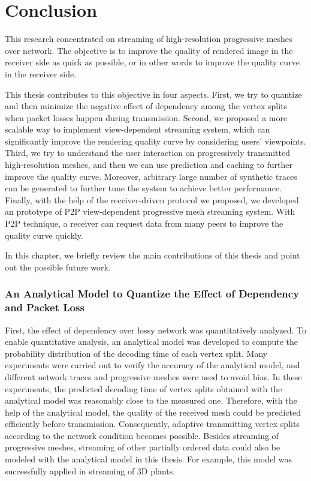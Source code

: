 \chapter{Conclusion}
\label{c:conclusion}
This research concentrated on streaming of high-resolution progressive meshes over network. 
The objective is to improve the quality of rendered image in the receiver side
as quick as possible, or in other words to improve the quality curve in the receiver
side. 

This thesis contributes to this objective in four aspects.
First, we try to quantize and then minimize the negative effect of dependency
among the vertex splits when packet losses happen during transmission.
Second, we proposed a more scalable way to implement view-dependent streaming
system, which can significantly improve the rendering quality curve by considering 
users' viewpoints. 
Third, we try to understand the user interaction on progressively transmitted 
high-resolution meshes, and then we can use prediction and caching to further 
improve the quality curve. Moreover, arbitrary large number of synthetic traces 
can be generated to further tune the system to achieve better performance.
Finally, with the help of the receiver-driven protocol we proposed, we developed 
an prototype of P2P view-dependent progressive mesh streaming system. With P2P
technique, a receiver can request data from many peers to improve the quality curve 
quickly.

In this chapter, we briefly review the main contributions of this thesis and point
out the possible future work.

\subsection{An Analytical Model to Quantize the Effect of Dependency and Packet Loss}
First, the effect of dependency over lossy network was quantitatively analyzed. 
To enable quantitative analysis, an analytical model was developed to compute 
the probability distribution of the decoding time of each vertex split. 
Many experiments were carried out to verify the accuracy of the analytical model, 
and different network traces and progressive meshes were used to avoid bias. 
In these experiments, the predicted decoding time of vertex splits obtained 
with the analytical model was reasonably close to the measured one. 
Therefore, with the help of the analytical model, 
the quality of the received mesh could be predicted efficiently before transmission.
Consequently, adaptive transmitting vertex splits according to the network condition
becomes possible. Besides streaming of progressive meshes, 
streaming of other partially ordered data could also be modeled
with the analytical model in this thesis. 
For example, this model was successfully applied in streaming of 3D plants.

